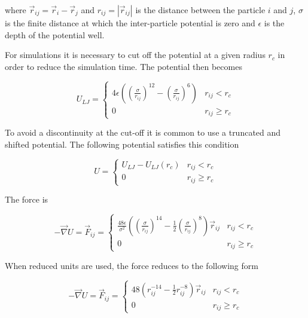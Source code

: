 \documentclass[a4paper]{article}
\begin{document}
where $\vec{r}_{ij} = \vec{r}_i - \vec{r}_j$ and $r_{ij} = |\vec{r}_{ij}|$ is the distance between the particle $i$ and $j$, $\sigma$ is the finite distance at which the inter-particle potential is zero and $\epsilon$ is the depth of the potential well.

For simulations it is necessary to cut off the potential at a given radius $r_c$ in order to reduce the simulation time. The potential then becomes

\begin{equation}
U_{LJ} = 
\begin{cases}
4 \epsilon \left( \left( \frac{\sigma}{r_{ij}} \right)^{12} - \left( \frac{\sigma}{r_{ij}} \right)^6 \right) & r_{ij} < r_c \\
0 & r_{ij} \geq r_c
\end{cases}
\label{eq:lennard_jones_2}
\end{equation}

To avoid a discontinuity at the cut-off it is common to use a truncated and shifted potential. The following potential satisfies this condition

\begin{equation}
U = 
\begin{cases}
U_{LJ} - U_{LJ}(r_c) & r_{ij} < r_c \\
0 & r_{ij} \geq r_c
\end{cases}
\label{eq:lennard_jones_3}
\end{equation}

The force is

\begin{equation}
- \vec{\nabla} U = \vec{F}_{ij} =  
\begin{cases}
\frac{48 \epsilon}{\sigma^2} \left( \left( \frac{\sigma}{r_{ij}} \right)^{14} - \frac{1}{2} \left( \frac{\sigma}{r_{ij}} \right)^8 \right) \vec{r}_{ij} & r_{ij} < r_c \\
0 & r_{ij} \geq r_c
\end{cases}
\label{eq:lennard_jones_force}
\end{equation}

When reduced units are used, the force reduces to the following form

\begin{equation}
- \vec{\nabla} U = \vec{F}_{ij} =  
\begin{cases}
48 \left( r_{ij}^{-14} - \frac{1}{2} r_{ij}^{-8} \right) \vec{r}_{ij} & r_{ij} < r_c \\
0 & r_{ij} \geq r_c
\end{cases}
\label{eq:lennard_jones_force_reduced}
\end{equation}
\end{document}
